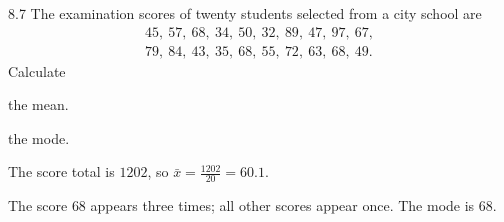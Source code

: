 \documentclass[11pt,oneside]{article}
\begin{document}
\begin{exercise}{8.7}
The examination scores of twenty students selected from a city school are
\[
\begin{gathered}
45, \ 57, \ 68, \ 34, \ 50, \ 32, \ 89, \ 47, \ 97, \ 67, \\
79, \ 84, \ 43, \ 35, \ 68, \ 55, \ 72, \ 63, \ 68, \ 49.
\end{gathered}
\]
Calculate
\begin{exercisesubparts}
\item the mean.
\item the mode.
\end{exercisesubparts}
\end{exercise}
\begin{solution}
\begin{exercisesubparts}
\item The score total is $1202$, so $\displaystyle\bar x=\frac{1202}{20}=\boxed{60.1}$.
\item The score $68$ appears three times; all other scores appear once. The mode is $\boxed{68}$.
\end{exercisesubparts}
\end{solution}
\end{document}
